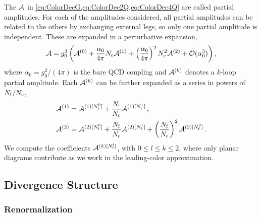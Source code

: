 The $\mathcal{A}$ in \cref{eq:ColorDecG,eq:ColorDec2Q,eq:ColorDec4Q} are
called partial amplitudes. For each of the amplitudes considered, all
partial amplitudes can be related to the others by exchanging external
legs, so only one partial amplitude is independent. These are expanded in a perturbative
expansion,
\begin{equation}
    \label{eq:partials} 
    \mathcal{A}
    = g^{3}_0 \left(
        \mathcal{A}^{(0)}
      + \frac{\alpha_0}{4\pi}N_\mathrm{c} \mathcal{A}^{(1)}
      + \left(\frac{\alpha_0}{4\pi}\right)^2N_\mathrm{c}^2  \mathcal{A}^{(2)} 
      + \mathcal{O}(\alpha_0^3)
      \right),
\end{equation}
where $\alpha_0=g_0^2/(4\pi)$ is the bare QCD coupling and 
$\mathcal{A}^{(k)}$ denotes a $k$-loop partial amplitude. Each 
$\mathcal{A}^{(k)}$ can be further expanded as a series in powers of 
$N_\mathrm{f}/N_\mathrm{c}$,
\begin{align}
  \label{eq:nfdecomposition} 
  \begin{split}
  \mathcal{A}^{(1)} &= \mathcal{A}^{(1)[N_\mathrm{f}^0]} + 
  \frac{N_\mathrm{f}}{N_\mathrm{c}}\mathcal{A}^{(1)[N_\mathrm{f}^1]}\,, \\
  \mathcal{A}^{(2)} &= \mathcal{A}^{(2)[N_\mathrm{f}^0]} +
  \frac{N_\mathrm{f}}{N_\mathrm{c}}\mathcal{A}^{(2)[N_\mathrm{f}^1]} +
  \left(\frac{N_\mathrm{f}}{N_\mathrm{c}}\right)^2\mathcal{A}^{(2)[N_\mathrm{f}^2]}\,.
  \end{split} 
\end{align}
We compute the coefficients $\mathcal{A}^{(k)[N_\mathrm{f}^l]}$, with $0\leq l\leq
k\leq2$, where only planar diagrams contribute as we work in the
leading-color approximation.


\subsection{Divergence Structure}
\label{sec:IR}

\subsubsection{Renormalization}

